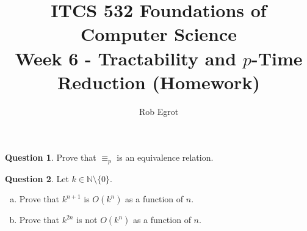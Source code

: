 \documentclass{article}
\title{ITCS 532 Foundations of Computer Science\\
Week 6 - Tractability and $p$-Time Reduction (Homework)}
\author{Rob Egrot}
\date{}
\theoremstyle{definition}
\newtheorem{Q}{Question}
\begin{document}
\maketitle

\begin{Q}
Prove that $\equiv_p$ is an equivalence relation.
\end{Q}
\begin{comment}
\textbf{Solution}
We know $\leq_p$ is reflexive by exercise 7.5.1 in the notes, so clearly $A\equiv_p A$. We also know $\leq_p$ is transitive by theorem 7.5.2, so if $A\equiv_p B$ and $B\equiv_p C$, then by definition of $\equiv_p$ we have $A\leq_p B$ and $B\leq_p C$, so $A\leq_p C$. Similarly we have $C\leq_p A$ and so $A\equiv_p C$. So $\equiv_p$ is transitive. Finally, $A\equiv_p B \iff A\leq_p B$ and $B\leq_p A$, and so $\equiv_p$ is obviously symmetric.
\end{comment}

\begin{Q}
Let $k\in \mathbb{N}\setminus\{0\}$.
\begin{enumerate}[a)]
\item Prove that $k^{n+1}$ is $O(k^n)$ as a function of $n$.
\item Prove that $k^{2n}$ is not $O(k^n)$ as a function of $n$.
\end{enumerate}
\end{Q}
\begin{comment}
\textbf{Solution}
\begin{enumerate}[a)]
\item We have $k^{n+1} = k.k^n $ for all $n$. So $k^{n+1}\leq ck^n$ when $c=k$. I.e. $k^{n+1}$ is $O(k^n)$.
\item Suppose $k^{2n}$ is $O(k^n)$. Then there is a constant $c$ with $k^{2n}\leq ck^n$ for `large' $n$. Taking $\log_k$ of both sides gives
\[2n\leq \log_k c + n,\]
and so
\[n \leq \log_k c,\]
but this obviously cannot be true for all `large' $n$. 

\end{enumerate}
\end{comment}
\end{document}
